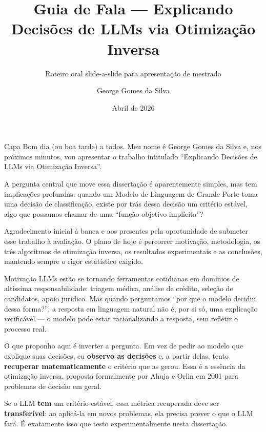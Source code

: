 \documentclass[aspectratio=169,10pt]{beamer}
\title[Guia de Apresenta\c{c}\~ao]{Guia de Fala --- Explicando Decis\~oes de LLMs via Otimiza\c{c}\~ao Inversa}
\subtitle{Roteiro oral slide-a-slide para apresenta\c{c}\~ao de mestrado}
\author{George Gomes da Silva}
\institute{Programa de P\'os-Gradua\c{c}\~ao em Inform\'atica}
\date{Abril de 2026}
\begin{document}
\begin{frame}{Capa}
  \small
  Bom dia (ou boa tarde) a todos. Meu nome \'e George Gomes da Silva e, nos pr\'oximos minutos,
  vou apresentar o trabalho intitulado ``Explicando Decis\~oes de LLMs via Otimiza\c{c}\~ao Inversa''.
  \medskip

  A pergunta central que move essa disserta\c{c}\~ao \'e aparentemente simples, mas tem implica\c{c}\~oes profundas:
  quando um Modelo de Linguagem de Grande Porte toma uma decis\~ao de classifica\c{c}\~ao, existe por tr\'as
  dessa decis\~ao um crit\'erio est\'avel, algo que possamos chamar de uma ``fun\c{c}\~ao objetivo impl\'icita''?
  \medskip

  Agradecimento inicial \`a banca e aos presentes pela oportunidade de submeter esse trabalho \`a
  avalia\c{c}\~ao. O plano de hoje \'e percorrer motiva\c{c}\~ao, metodologia, os tr\^es algoritmos de otimiza\c{c}\~ao
  inversa, os resultados experimentais e as conclus\~oes, mantendo sempre o rigor estat\'istico exigido.
\end{frame}

\begin{frame}{Motiva\c{c}\~ao}
  \small
  LLMs est\~ao se tornando ferramentas cotidianas em dom\'inios de alt\'issima responsabilidade:
  triagem m\'edica, an\'alise de cr\'edito, sele\c{c}\~ao de candidatos, apoio jur\'idico. Mas quando
  perguntamos ``por que o modelo decidiu dessa forma?'', a resposta em linguagem natural n\~ao \'e,
  por si s\'o, uma explica\c{c}\~ao verific\'avel --- o modelo pode estar racionalizando a resposta, sem
  refletir o processo real.
  \medskip

  O que proponho aqui \'e inverter a pergunta. Em vez de pedir ao modelo que explique suas decis\~oes,
  eu \textbf{observo as decis\~oes} e, a partir delas, tento \textbf{recuperar matematicamente} o crit\'erio
  que as gerou. Essa \'e a ess\^encia da otimiza\c{c}\~ao inversa, proposta formalmente por Ahuja e Orlin em 2001
  para problemas de decis\~ao em geral.
  \medskip

  Se o LLM \textbf{tem} um crit\'erio est\'avel, essa m\'etrica recuperada deve ser \textbf{transfer\'ivel}:
  ao aplic\'a-la em novos problemas, ela precisa prever o que o LLM far\'a. \'E exatamente isso que testo
  experimentalmente nesta disserta\c{c}\~ao.
\end{frame}
\end{document}
